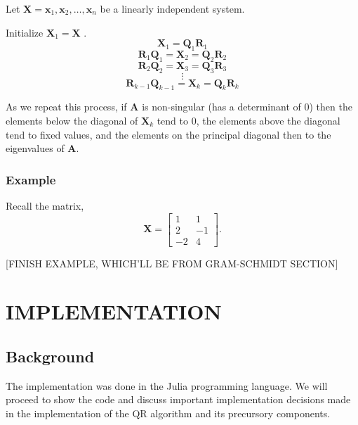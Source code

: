 \documentclass[onecolumn]{webofc}
\begin{document}
Let $\mathbf{X} = \mathbf{x}_1, \mathbf{x}_2, \ldots, \mathbf{x}_n$ be a linearly independent system.

Initialize $\mathbf{X}_1 = \mathbf{X}$ .
$$\mathbf{X}_1 = \mathbf{Q}_1\mathbf{R}_1$$
$$\mathbf{R}_1\mathbf{Q}_1 = \mathbf{X}_2 = \mathbf{Q}_2\mathbf{R}_2$$
$$\mathbf{R}_2\mathbf{Q}_2 = \mathbf{X}_3 = \mathbf{Q}_3\mathbf{R}_3$$
$$\vdots$$
$$\mathbf{R}_{k-1}\mathbf{Q}_{k-1} = \mathbf{X}_k = \mathbf{Q}_k\mathbf{R}_k$$

As we repeat this process, if $\mathbf{A}$ is non-singular (has a determinant of 0) then the elements below the diagonal of $\mathbf{X}_k$ tend to $0$, the elements above the diagonal tend to fixed values, and the elements on the principal diagonal then to the eigenvalues of $\mathbf{A}$.

\subsubsection*{Example}
Recall the matrix,
$$\mathbf{X} =  \begin{bmatrix}
1 & 1 \\
2 & -1 \\
-2 & 4 
\end{bmatrix}. $$

[FINISH EXAMPLE, WHICH'LL BE FROM GRAM-SCHMIDT SECTION]

\section{IMPLEMENTATION}

\subsection{Background}
The implementation was done in the Julia programming language. We will proceed to show the code and discuss important implementation decisions made in the implementation of the QR algorithm and its precursory components.
\end{document}

